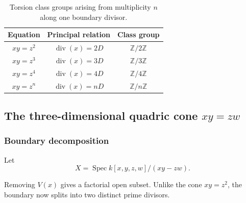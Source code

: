 \documentclass[12pt,a4paper]{article}
\DeclareMathOperator{\Spec}{Spec}
\newcommand{\divisor}{\operatorname{div}}
\newcommand{\Z}{\mathbb{Z}}
\providecommand{\Spec}{\operatorname{Spec}}
\theoremstyle{notespace}
\begin{document}
\begin{table}[htbp]
	\centering
	\renewcommand{\arraystretch}{1.35}
	\begin{tabular}{|c|c|c|}
		\hline
		\textbf{Equation}
		&
		\textbf{Principal relation}
		&
		\textbf{Class group}
		\\
		\hline
		\(xy=z^2\)
		&
		\(\divisor(x)=2D\)
		&
		\(\Z/2\Z\)
		\\
		\hline
		\(xy=z^3\)
		&
		\(\divisor(x)=3D\)
		&
		\(\Z/3\Z\)
		\\
		\hline
		\(xy=z^4\)
		&
		\(\divisor(x)=4D\)
		&
		\(\Z/4\Z\)
		\\
		\hline
		\(xy=z^n\)
		&
		\(\divisor(x)=nD\)
		&
		\(\Z/n\Z\)
		\\
		\hline
	\end{tabular}
	\caption{Torsion class groups arising from multiplicity \(n\) along one boundary divisor.}
\end{table}

\subsection{\texorpdfstring{The three-dimensional quadric cone \(xy=zw\)}{The three-dimensional quadric cone xy=zw}}

\subsubsection{Boundary decomposition}

Let
\[
X=\Spec k[x,y,z,w]/(xy-zw).
\]

Removing \(V(x)\) gives a factorial open subset. Unlike the cone \(xy=z^2\), the boundary now splits into two distinct prime divisors.
\end{document}
